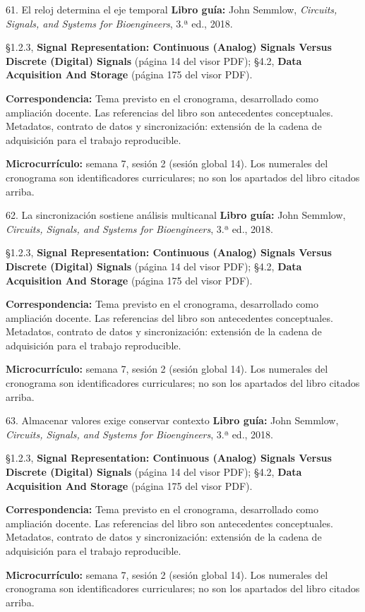 \documentclass[
  10pt,
  ignorenonframetext,
  aspectratio=169,
  spanish,
]{beamer}
\begin{document}
\begin{frame}{61. El reloj determina el eje temporal}
\label{el-reloj-determina-el-eje-temporal}
\textbf{Libro guía:} John Semmlow, \emph{Circuits, Signals, and Systems
for Bioengineers}, 3.ª ed., 2018.

§1.2.3, \textbf{Signal Representation: Continuous (Analog) Signals
Versus Discrete (Digital) Signals} (página 14 del visor PDF); §4.2,
\textbf{Data Acquisition And Storage} (página 175 del visor PDF).

\textbf{Correspondencia:} Tema previsto en el cronograma, desarrollado
como ampliación docente. Las referencias del libro son antecedentes
conceptuales. Metadatos, contrato de datos y sincronización: extensión
de la cadena de adquisición para el trabajo reproducible.

\textbf{Microcurrículo:} semana 7, sesión 2 (sesión global 14). Los
numerales del cronograma son identificadores curriculares; no son los
apartados del libro citados arriba.
\end{frame}

\begin{frame}{62. La sincronización sostiene análisis multicanal}
\label{la-sincronizaciuxf3n-sostiene-anuxe1lisis-multicanal}
\textbf{Libro guía:} John Semmlow, \emph{Circuits, Signals, and Systems
for Bioengineers}, 3.ª ed., 2018.

§1.2.3, \textbf{Signal Representation: Continuous (Analog) Signals
Versus Discrete (Digital) Signals} (página 14 del visor PDF); §4.2,
\textbf{Data Acquisition And Storage} (página 175 del visor PDF).

\textbf{Correspondencia:} Tema previsto en el cronograma, desarrollado
como ampliación docente. Las referencias del libro son antecedentes
conceptuales. Metadatos, contrato de datos y sincronización: extensión
de la cadena de adquisición para el trabajo reproducible.

\textbf{Microcurrículo:} semana 7, sesión 2 (sesión global 14). Los
numerales del cronograma son identificadores curriculares; no son los
apartados del libro citados arriba.
\end{frame}

\begin{frame}{63. Almacenar valores exige conservar contexto}
\label{almacenar-valores-exige-conservar-contexto}
\textbf{Libro guía:} John Semmlow, \emph{Circuits, Signals, and Systems
for Bioengineers}, 3.ª ed., 2018.

§1.2.3, \textbf{Signal Representation: Continuous (Analog) Signals
Versus Discrete (Digital) Signals} (página 14 del visor PDF); §4.2,
\textbf{Data Acquisition And Storage} (página 175 del visor PDF).

\textbf{Correspondencia:} Tema previsto en el cronograma, desarrollado
como ampliación docente. Las referencias del libro son antecedentes
conceptuales. Metadatos, contrato de datos y sincronización: extensión
de la cadena de adquisición para el trabajo reproducible.

\textbf{Microcurrículo:} semana 7, sesión 2 (sesión global 14). Los
numerales del cronograma son identificadores curriculares; no son los
apartados del libro citados arriba.
\end{frame}
\end{document}
